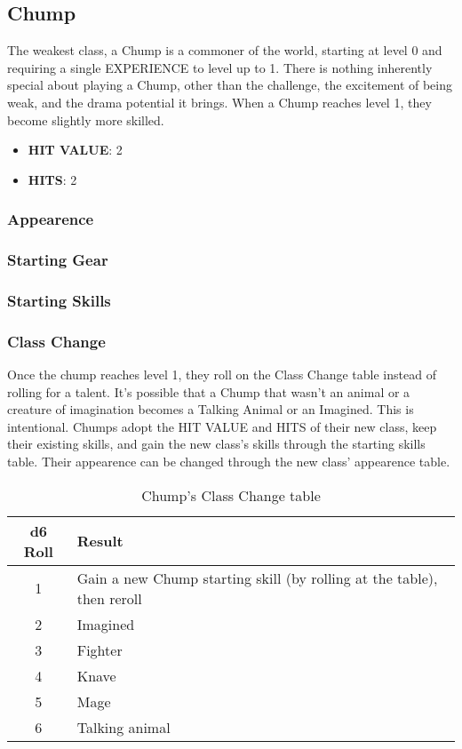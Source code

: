 \subsection{Chump}
The weakest class, a Chump is a commoner of the world, starting at level 0 and requiring a single EXPERIENCE to level up to 1. There is nothing inherently special about playing a Chump, other than the challenge, the excitement of being weak, and the drama potential it brings. When a Chump reaches level 1, they become slightly more skilled.

\begin{multicols}[2]
\begin{itemize}
  \item \textbf{HIT VALUE}: 2
  \item \textbf{HITS}: 2
\end{itemize}

\subsubsection*{Appearence}


\subsubsection*{Starting Gear}


\subsubsection*{Starting Skills}


\subsubsection*{Class Change}
Once the chump reaches level 1, they roll on the Class Change table instead of rolling for a talent. It's possible that a Chump that wasn't an animal or a creature of imagination becomes a Talking Animal or an Imagined. This is intentional. Chumps adopt the HIT VALUE and HITS of their new class, keep their existing skills, and gain the new class's skills through the starting skills table. Their appearence can be changed through the new class' appearence table.

\end{multicols}

\begin{table}[b!]
\centering
\begin{tabular}{|c|l|}
\hline
\textbf{d6 Roll} & \textbf{Result} \\
\hline
1 & Gain a new Chump starting skill (by rolling at the table), then reroll \\
2 & Imagined \\
3 & Fighter \\
4 & Knave \\
5 & Mage \\
6 & Talking animal \\
\hline
\end{tabular}
\caption{Chump's Class Change table}
\label{tab:chump_change}
\end{table}
